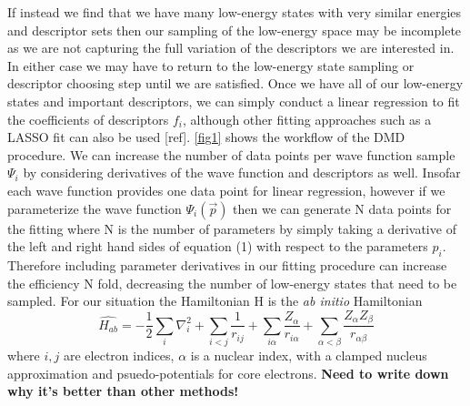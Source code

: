 \documentclass{article}
\begin{document}
If instead we find that we have many low-energy states with very similar energies and descriptor sets then our sampling of the low-energy space may be incomplete as we are not capturing the full variation of the descriptors we are interested in. 
In either case we may have to return to the low-energy state sampling or descriptor choosing step until we are satisfied. Once we have all of our low-energy states and important descriptors, we can simply conduct a linear regression to fit the coefficients of descriptors $f_i$, although other fitting approaches such as a LASSO fit can also be used [ref].
\ref{fig1} shows the workflow of the DMD procedure. 
We can increase the number of data points per wave function sample $\Psi_i$ by considering derivatives of the wave function and descriptors as well. 
Insofar each wave function provides one data point for linear regression, however if we parameterize the wave function $\Psi_i(\vec{p})$ then we can generate N data points for the fitting where N is the number of parameters by simply taking a derivative of the left and right hand sides of equation (1) with respect to the parameters $p_i$. 
Therefore including parameter derivatives in our fitting procedure can increase the efficiency N fold, decreasing the number of low-energy states that need to be sampled. 
For our situation the Hamiltonian H is the \textit{ab initio} Hamiltonian 
\begin{equation}
\hat{H_{ab}} = -\frac{1}{2} \sum_i \nabla_i^2 + \sum_{i<j} \frac{1}{r_{ij}} + \sum_{i\alpha} \frac{Z_\alpha}{r_{i\alpha}} + \sum_{\alpha<\beta} \frac{Z_{\alpha}Z_{\beta}}{r_{\alpha \beta}}
\end{equation}
where $i,j$ are electron indices, $\alpha$ is a nuclear index, with a clamped nucleus approximation and psuedo-potentials for core electrons. \textbf{Need to write down why it's better than other methods!}
\end{document}

